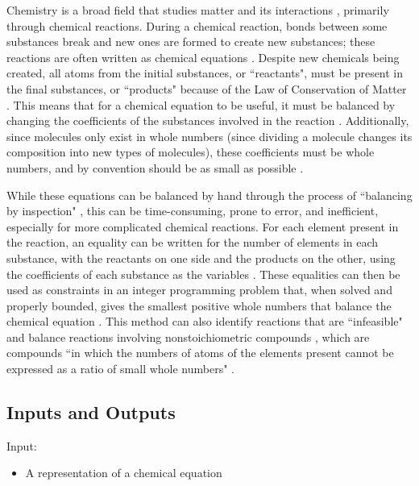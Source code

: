 \documentclass{article}
\begin{document}
Chemistry is a broad field that studies matter and its interactions
\cite{gordon_chm101_2023}, primarily through chemical reactions.
During a chemical reaction, bonds between some substances break and new ones are
formed to create new substances; these reactions are often written as chemical
equations \cite{lund_introduction_2023}. Despite new chemicals being created,
all atoms from the initial substances, or ``reactants", must be present in the
final substances, or ``products" because of the Law of Conservation of Matter
\cite{lund_introduction_2023}. This means that for a chemical equation to be
useful, it must be balanced by changing the coefficients of the substances
involved in the reaction \cite{lund_introduction_2023}. Additionally, since
molecules only exist in whole numbers (since dividing a molecule changes its
composition into new types of molecules), these coefficients must be whole
numbers, and by convention should be as small as possible
\cite{lund_introduction_2023}.

While these equations can be balanced by hand through the process of
``balancing by inspection" \cite{lund_introduction_2023}, this can be
time-consuming, prone
to error, and inefficient, especially for more complicated chemical reactions.
For each element present in the reaction, an equality can be written for the
number of elements in each substance, with the reactants on one side and the
products on the other, using the coefficients of each substance as the
variables \cite{hamid_balancing_2019}. These equalities can then be used as
constraints in an integer programming problem that, when solved and properly
bounded, gives the smallest positive whole numbers that balance the chemical
equation \cite{lund_introduction_2023, hamid_balancing_2019}. This method can
also identify reactions that are ``infeasible" and balance reactions involving
nonstoichiometric compounds \cite{hamid_balancing_2019}, which are compounds
``in which the numbers of atoms of the elements present cannot be expressed as
a ratio of small whole numbers"
\cite{the_editors_of_encyclopaedia_britannica_nonstoichiometric_2010}.

\subsection{Inputs and Outputs} \label{io}

\noindent Input:

\begin{itemize}
	\item A representation of a chemical equation
\end{itemize}
\end{document}
